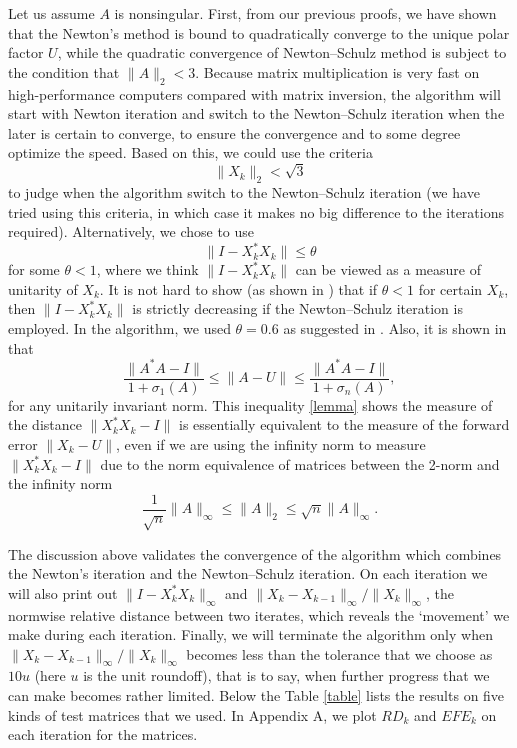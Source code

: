 \documentclass[12pt]{article}
\def\norm#1{\|#1\|}
\begin{document}
Let us assume $A$ is nonsingular. First, from our previous proofs, we have shown that 
the Newton's method is bound to quadratically converge to the unique polar factor $U$, 
while the quadratic convergence of Newton--Schulz method is subject to the condition 
that $\norm{A}_2<3$. Because matrix multiplication is very fast on high-performance 
computers compared with matrix inversion, the algorithm will start with Newton 
iteration and switch to the Newton--Schulz iteration when the later is certain to 
converge, to ensure the convergence and to some degree optimize the speed. Based on 
this, we could use the criteria 
$$
\norm{X_k}_2 < \sqrt{3}
$$
to judge when the algorithm switch to the Newton--Schulz iteration (we have tried using this criteria, in which case it makes no big difference to the iterations required). Alternatively, we chose to use 
\begin{equation} \label{criteria}
\norm{I-X_k^*{X_k}}\le \theta
\end{equation}
for some $\theta <1$, where we think $\norm{I-X_k^*{X_k}}$ can be viewed as a measure of unitarity of $X_k$. It is not hard to show (as shown in \cite{hisc90}) that if $\theta<1$ for certain $X_k$, then $\norm{I-X_k^*{X_k}}$ is strictly decreasing if the Newton--Schulz iteration is employed. In the algorithm, we used $\theta=0.6$ as suggested in \cite{hisc90}. Also, it is shown in \cite[Lem.~8.17]{high:FM} that
\begin{equation} \label{lemma}
\frac{\norm{A^*A-I}}{1+\sigma_1(A)}\le \norm{A-U} \le \frac{\norm{A^*A-I}}{1+\sigma_n(A)},
\end{equation}
for any unitarily invariant norm. This inequality \eqref{lemma} shows the measure of the distance $\norm{X_k^*{X_k}-I}$ is essentially equivalent to the measure of the forward error $\norm{X_k-U}$, even if we are using the infinity norm to measure $\norm{X_k^*{X_k}-I}$ due to the norm equivalence of matrices between the 2-norm and the infinity norm
$$
\frac{1}{\sqrt{n}}\norm{A}_\infty\le\norm{A}_2\le\sqrt{n}\norm{A}_\infty.
$$

The discussion above validates the convergence of the algorithm which combines the Newton's iteration and the Newton--Schulz iteration. On each iteration we will also print out $\norm{I-X_k^*{X_k}}_\infty$ and $\norm{X_k-X_{k-1}}_\infty/\norm{X_k}_\infty$, the normwise relative distance between two iterates, which reveals the `movement' we make during each iteration. Finally, we will terminate the algorithm only when $\norm{X_k-X_{k-1}}_\infty/\norm{X_k}_\infty$ becomes less than the tolerance that we choose as $10u$ (here $u$ is the unit roundoff), that is to say, when further progress that we can make becomes rather limited. Below the Table \ref{table} lists the results on five kinds of test matrices that we used. In Appendix A, we plot $RD_k$ and $EFE_k$ on each iteration for the matrices. 
\end{document}
